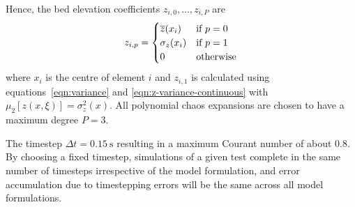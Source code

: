 Hence, the bed elevation coefficients $z_{i,0}, \ldots, z_{i,P}$ are
\begin{align}
    z_{i,p} = \begin{cases}
    \overline{z}(x_i) & \text{if $p=0$} \\
    \sigma_z(x_i) & \text{if $p=1$} \\
    0 & \text{otherwise}
    \end{cases}
\end{align}
where $x_i$ is the centre of element $i$ and $z_{i,1}$ is calculated using equations~\eqref{eqn:variance} and \eqref{eqn:z-variance-continuous} with $\mu_2[z(x, \xi)] = \sigma_z^2(x)$.
All polynomial chaos expansions are chosen to have a maximum degree $P = 3$.

The timestep $\Delta t = \SI{0.15}{\second}$ resulting in a maximum Courant number of about $0.8$.  By choosing a fixed timestep, simulations of a given test complete in the same number of timesteps irrespective of the model formulation, and error accumulation due to timestepping errors will be the same across all model formulations.




